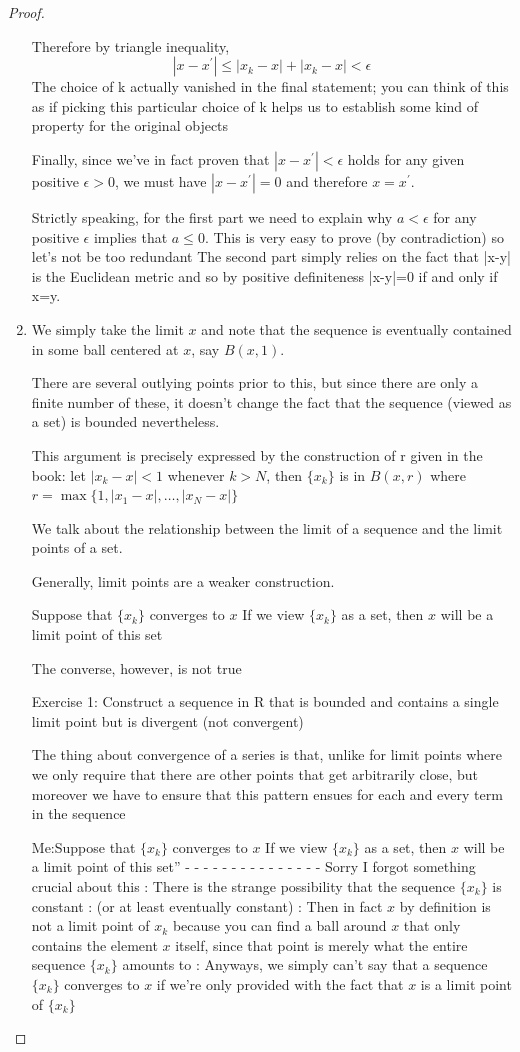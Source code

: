 \begin{proof}
\begin{enumerate}[label=(\arabic*)]
Therefore by triangle inequality,
\[ |x-x^\prime| \le |x_k-x| + |x_k-x|<\epsilon \]
The choice of k actually vanished in the final statement; you can think of this as if picking this particular choice of k helps us to establish some kind of property for the original objects

Finally, since we've in fact proven that $|x-x^\prime|<\epsilon$ holds for any given positive $\epsilon>0$, we must have $|x-x^\prime|=0$ and therefore $x=x^\prime$.

Strictly speaking, for the first part we need to explain why $a<\epsilon$ for any positive $\epsilon$ implies that $a \le 0$. 
This is very easy to prove (by contradiction) so let's not be too redundant
The second part simply relies on the fact that |x-y| is the Euclidean metric and so by positive definiteness |x-y|=0 if and only if x=y.

\item We simply take the limit $x$ and note that the sequence is eventually contained in some ball centered at $x$, say $B(x,1)$.

There are several outlying points prior to this, but since there are only a finite number of these, it doesn't change the fact that the sequence (viewed as a set) is bounded nevertheless.

This argument is precisely expressed by the construction of r given in the book: let $|x_k-x|<1$ whenever $k>N$, then $\{x_k\}$ is in $B(x,r)$ where $r=\max\{1,|x_1-x|,\dots,|x_N-x|\}$



We talk about the relationship between the limit of a sequence and the limit points of a set.

Generally, limit points are a weaker construction.


Suppose that $\{x_k\}$ converges to $x$
If we view $\{x_k\}$ as a set, then $x$ will be a limit point of this set

The converse, however, is not true

Exercise 1: Construct a sequence in R that is bounded and contains a single limit point but is divergent (not convergent)

The thing about convergence of a series is that, unlike for limit points where we only require that there are other points that get arbitrarily close, but moreover we have to ensure that this pattern ensues for each and every term in the sequence

Me:Suppose that $\{x_k\}$ converges to $x$
If we view $\{x_k\}$ as a set, then $x$ will be a limit point of this set”
- - - - - - - - - - - - - - -
Sorry I forgot something crucial about this
:
There is the strange possibility that the sequence $\{x_k\}$ is constant
:
(or at least eventually constant)
:
Then in fact $x$ by definition is not a limit point of $x_k$ because you can find a ball around $x$ that only contains the element $x$ itself, since that point is merely what the entire sequence $\{x_k\}$ amounts to
:
Anyways, we simply can't say that a sequence $\{x_k\}$ converges to $x$ if we're only provided with the fact that $x$ is a limit point of $\{x_k\}$


\end{enumerate}
\end{proof}
